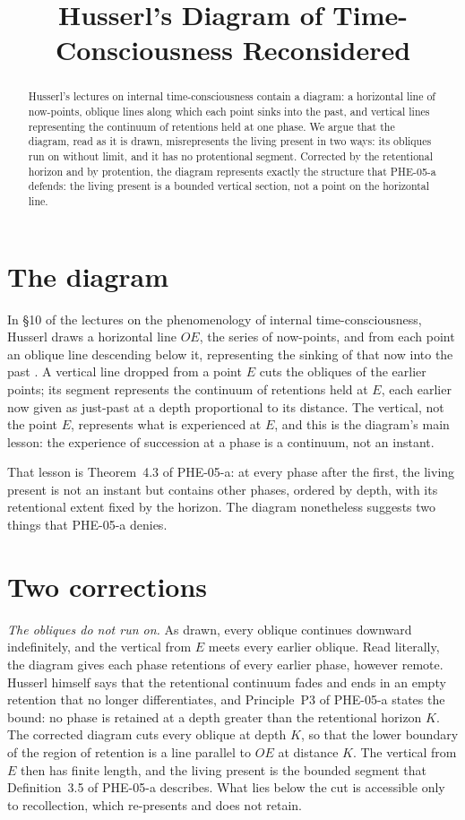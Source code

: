 \documentclass{situationist-preprint}
\title{Husserl's Diagram of Time-Consciousness Reconsidered}
\begin{document}
\maketitle

\begin{abstract}
Husserl's lectures on internal time-consciousness contain a diagram: a horizontal line of now-points, oblique lines along which each point sinks into the past, and vertical lines representing the continuum of retentions held at one phase. We argue that the diagram, read as it is drawn, misrepresents the living present in two ways: its obliques run on without limit, and it has no protentional segment. Corrected by the retentional horizon and by protention, the diagram represents exactly the structure that PHE-05-a defends: the living present is a bounded vertical section, not a point on the horizontal line.
\end{abstract}

\section{The diagram}

In \S10 of the lectures on the phenomenology of internal time-consciousness, Husserl draws a horizontal line $OE$, the series of now-points, and from each point an oblique line descending below it, representing the sinking of that now into the past \citep{Husserl1966}. A vertical line dropped from a point $E$ cuts the obliques of the earlier points; its segment represents the continuum of retentions held at $E$, each earlier now given as just-past at a depth proportional to its distance. The vertical, not the point $E$, represents what is experienced at $E$, and this is the diagram's main lesson: the experience of succession at a phase is a continuum, not an instant.

That lesson is Theorem~4.3 of PHE-05-a: at every phase after the first, the living present is not an instant but contains other phases, ordered by depth, with its retentional extent fixed by the horizon. The diagram nonetheless suggests two things that PHE-05-a denies.

\section{Two corrections}

\emph{The obliques do not run on.} As drawn, every oblique continues downward indefinitely, and the vertical from $E$ meets every earlier oblique. Read literally, the diagram gives each phase retentions of every earlier phase, however remote. Husserl himself says that the retentional continuum fades and ends in an empty retention that no longer differentiates, and Principle~P3 of PHE-05-a states the bound: no phase is retained at a depth greater than the retentional horizon $K$. The corrected diagram cuts every oblique at depth $K$, so that the lower boundary of the region of retention is a line parallel to $OE$ at distance $K$. The vertical from $E$ then has finite length, and the living present is the bounded segment that Definition~3.5 of PHE-05-a describes. What lies below the cut is accessible only to recollection, which re-presents and does not retain.
\end{document}
